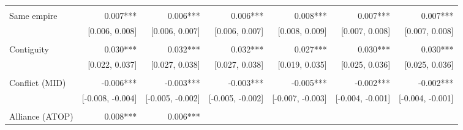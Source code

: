 \begin{table}[!h]
\begin{tabular}{lllllll}
  \multicolumn{1}{r}{} &
  \multicolumn{1}{r}{} \\
\multicolumn{1}{l}{Same empire} &
  \multicolumn{1}{|r}{0.007***} &
  \multicolumn{1}{r}{0.006***} &
  \multicolumn{1}{r}{0.006***} &
  \multicolumn{1}{r}{0.008***} &
  \multicolumn{1}{r}{0.007***} &
  \multicolumn{1}{r}{0.007***} \\
\multicolumn{1}{l}{} &
  \multicolumn{1}{|r}{[0.006,   0.008]} &
  \multicolumn{1}{r}{[0.006,   0.007]} &
  \multicolumn{1}{r}{[0.006,   0.007]} &
  \multicolumn{1}{r}{[0.008,   0.009]} &
  \multicolumn{1}{r}{[0.007,   0.008]} &
  \multicolumn{1}{r}{[0.007,   0.008]} \\
\multicolumn{1}{l}{} &
  \multicolumn{1}{|r}{} &
  \multicolumn{1}{r}{} &
  \multicolumn{1}{r}{} &
  \multicolumn{1}{r}{} &
  \multicolumn{1}{r}{} &
  \multicolumn{1}{r}{} \\
\multicolumn{1}{l}{Contiguity} &
  \multicolumn{1}{|r}{0.030***} &
  \multicolumn{1}{r}{0.032***} &
  \multicolumn{1}{r}{0.032***} &
  \multicolumn{1}{r}{0.027***} &
  \multicolumn{1}{r}{0.030***} &
  \multicolumn{1}{r}{0.030***} \\
\multicolumn{1}{l}{} &
  \multicolumn{1}{|r}{[0.022,   0.037]} &
  \multicolumn{1}{r}{[0.027,   0.038]} &
  \multicolumn{1}{r}{[0.027,   0.038]} &
  \multicolumn{1}{r}{[0.019,   0.035]} &
  \multicolumn{1}{r}{[0.025,   0.036]} &
  \multicolumn{1}{r}{[0.025,   0.036]} \\
\multicolumn{1}{l}{} &
  \multicolumn{1}{|r}{} &
  \multicolumn{1}{r}{} &
  \multicolumn{1}{r}{} &
  \multicolumn{1}{r}{} &
  \multicolumn{1}{r}{} &
  \multicolumn{1}{r}{} \\
\multicolumn{1}{l}{Conflict (MID)} &
  \multicolumn{1}{|r}{-0.006***} &
  \multicolumn{1}{r}{-0.003***} &
  \multicolumn{1}{r}{-0.003***} &
  \multicolumn{1}{r}{-0.005***} &
  \multicolumn{1}{r}{-0.002***} &
  \multicolumn{1}{r}{-0.002***} \\
\multicolumn{1}{l}{} &
  \multicolumn{1}{|r}{[-0.008,  -0.004]} &
  \multicolumn{1}{r}{[-0.005,  -0.002]} &
  \multicolumn{1}{r}{[-0.005,  -0.002]} &
  \multicolumn{1}{r}{[-0.007,  -0.003]} &
  \multicolumn{1}{r}{[-0.004,  -0.001]} &
  \multicolumn{1}{r}{[-0.004,  -0.001]} \\
\multicolumn{1}{l}{} &
  \multicolumn{1}{|r}{} &
  \multicolumn{1}{r}{} &
  \multicolumn{1}{r}{} &
  \multicolumn{1}{r}{} &
  \multicolumn{1}{r}{} &
  \multicolumn{1}{r}{} \\
\multicolumn{1}{l}{Alliance (ATOP)} &
  \multicolumn{1}{|r}{0.008***} &
  \multicolumn{1}{r}{0.006***} &

\end{tabular}
\end{table}
